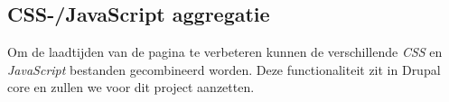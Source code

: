 \subsection{CSS-/JavaScript aggregatie}\label{aggregatie}

Om de laadtijden van de pagina te verbeteren kunnen de verschillende \textit{CSS} en \textit{JavaScript} bestanden gecombineerd worden. Deze functionaliteit zit in Drupal core en zullen we voor dit project aanzetten.
